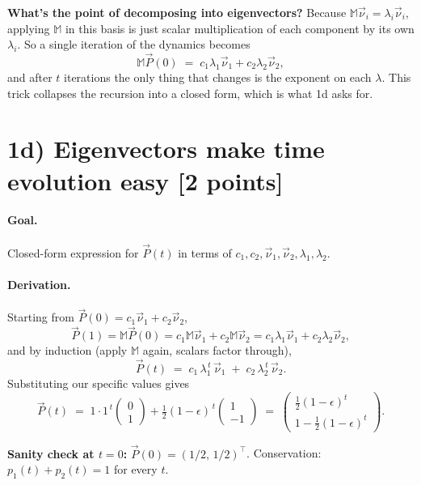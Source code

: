 \documentclass[12pt,a4paper]{article}
\newcommand{\M}{\mathbb{M}}
\newcommand{\vnu}{\vec{\nu}}
\newcommand{\vP}{\vec{P}}
\begin{document}
\begin{insight}
\textbf{What's the point of decomposing into eigenvectors?} Because $\M\vnu_i = \lambda_i\vnu_i$, applying $\M$ in this basis is just scalar multiplication of each component by its own $\lambda_i$. So a single iteration of the dynamics becomes
\[
\M\vP(0) \;=\; c_1\lambda_1\vnu_1 + c_2\lambda_2\vnu_2,
\]
and after $t$ iterations the only thing that changes is the exponent on each $\lambda$. This trick collapses the recursion into a closed form, which is what 1d asks for.
\end{insight}

\section*{1d) Eigenvectors make time evolution easy [2 points]}

\paragraph{Goal.} Closed-form expression for $\vP(t)$ in terms of $c_1, c_2, \vnu_1, \vnu_2, \lambda_1, \lambda_2$.

\paragraph{Derivation.} Starting from $\vP(0) = c_1\vnu_1 + c_2\vnu_2$,
\[
\vP(1) = \M\vP(0) = c_1\M\vnu_1 + c_2\M\vnu_2 = c_1\lambda_1\vnu_1 + c_2\lambda_2\vnu_2,
\]
and by induction (apply $\M$ again, scalars factor through),
\[
\boxed{\vP(t) \;=\; c_1\,\lambda_1^{\,t}\,\vnu_1 \;+\; c_2\,\lambda_2^{\,t}\,\vnu_2.}
\]
Substituting our specific values gives
\[
\vP(t) \;=\; 1\cdot 1^{\,t}\begin{pmatrix} 0\\1\end{pmatrix} + \tfrac{1}{2}(1-\epsilon)^{\,t}\begin{pmatrix} 1\\-1\end{pmatrix} \;=\; \begin{pmatrix} \tfrac{1}{2}(1-\epsilon)^{t} \\ 1 - \tfrac{1}{2}(1-\epsilon)^{t}\end{pmatrix}.
\]
\begin{sanity}
\textbf{Sanity check at $t=0$:} $\vP(0) = (1/2,\, 1/2)^{\top}$. \checkmark\quad
Conservation: $p_1(t)+p_2(t) = 1$ for every $t$. \checkmark
\end{sanity}
\end{document}

